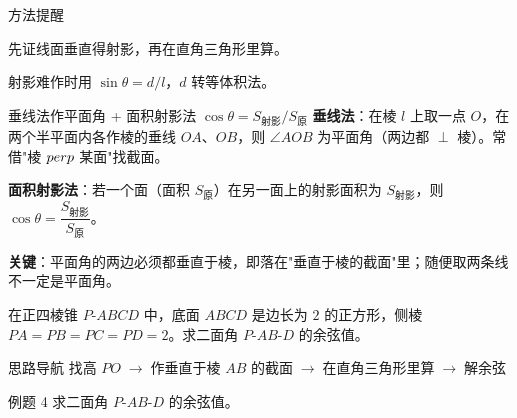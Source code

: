 \documentclass{exam-zh}
\begin{document}
\begin{eduSummaryBlock}{\eduIconPin}{方法提醒}
\begin{eduBulletList}
  \item 先证线面垂直得射影，再在直角三角形里算。  \item 射影难作时用 $\sin\theta=d/l$，$d$ 转等体积法。\end{eduBulletList}
\end{eduSummaryBlock}



\clearpage
{}


\begin{eduSolutionBox}{垂线法作平面角 + 面积射影法 $\cos\theta=S_{\text{射影}}/S_{\text{原}}$}
  \begingroup
  \setlength{\parskip}{2.5mm}
\textbf{垂线法}：在棱 $l$ 上取一点 $O$，在两个半平面内各作棱的垂线 $OA$、$OB$，则 $\angle AOB$ 为平面角（两边都 $\perp$ 棱）。常借"棱 $\\perp$ 某面"找截面。\par
\textbf{面积射影法}：若一个面（面积 $S_{\text{原}}$）在另一面上的射影面积为 $S_{\text{射影}}$，则 $\cos\theta=\dfrac{S_{\text{射影}}}{S_{\text{原}}}$。\par
\textbf{关键}：平面角的两边必须都垂直于棱，即落在"垂直于棱的截面"里；随便取两条线不一定是平面角。\par
  \endgroup
\end{eduSolutionBox}




\begin{eduProblemBlock}[例题 4]
在正四棱锥 $P\text{-}ABCD$ 中，底面 $ABCD$ 是边长为 $2$ 的正方形，侧棱 $PA=PB=PC=PD=2$。求二面角 $P\text{-}AB\text{-}D$ 的余弦值。
\end{eduProblemBlock}





\begin{eduAuxItem}{思路导航}
找高 $PO$$\;\to\;$作垂直于棱 $AB$ 的截面$\;\to\;$在直角三角形里算$\;\to\;$解余弦\end{eduAuxItem}




\begin{eduSubQuestionItem}{例题 4}
求二面角 $P\text{-}AB\text{-}D$ 的余弦值。\end{eduSubQuestionItem}
\end{document}

